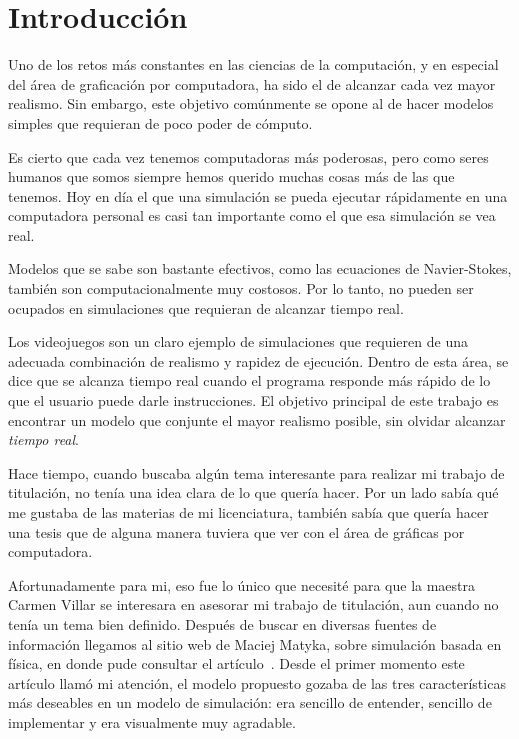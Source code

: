 \chapter*{Introducción}

Uno de los retos más constantes en las ciencias de la computación, y en especial del área de graficación por computadora, ha sido el de alcanzar cada vez mayor realismo. Sin embargo, este objetivo comúnmente se opone al de hacer modelos simples que requieran de poco poder de cómputo.

Es cierto que cada vez tenemos computadoras más poderosas, pero como seres humanos que somos siempre hemos querido muchas cosas más de las que tenemos. Hoy en día el que una simulación se pueda ejecutar rápidamente en una computadora personal es casi tan importante como el que esa simulación se vea real.

Modelos que se sabe son bastante efectivos, como las ecuaciones de Navier-Stokes, también son computacionalmente muy costosos. Por lo tanto, no pueden ser ocupados en simulaciones que requieran de alcanzar tiempo real.

Los videojuegos son un claro ejemplo de simulaciones que requieren de una adecuada combinación de realismo y rapidez de ejecución. Dentro de esta área, se dice que se alcanza tiempo real cuando el programa responde más rápido de lo que el usuario puede darle instrucciones. El objetivo principal de este trabajo es encontrar un modelo que conjunte el mayor realismo posible, sin olvidar alcanzar \emph{tiempo real}.

Hace tiempo, cuando buscaba algún tema interesante para realizar mi trabajo de titulación, no tenía una idea clara de lo que quería hacer. Por un lado sabía qué me gustaba de las materias de mi licenciatura, también sabía que quería hacer una tesis que de alguna manera tuviera que ver con el área de gráficas por computadora.

Afortunadamente para mi, eso fue lo único que necesité para que la maestra Carmen Villar se interesara en asesorar mi trabajo de titulación, aun cuando no tenía un tema bien definido. Después de buscar en diversas fuentes de información llegamos al sitio web de Maciej Matyka, sobre simulación basada en física, en donde pude consultar el artículo~\cite{Matyka:Presion}. Desde el primer momento este artículo llamó  mi atención, el modelo propuesto gozaba de las tres características más deseables en un modelo de simulación: era sencillo de entender, sencillo de implementar y era visualmente muy agradable.

